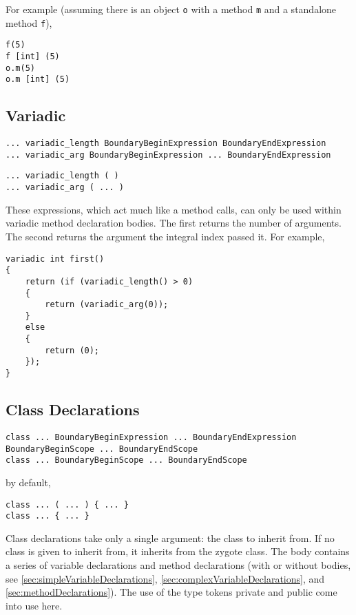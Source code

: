\documentclass[10pt,a4paper]{article}
\begin{document}
For example (assuming there is an object \verb|o| with a method \verb|m| and a standalone method \verb|f|),
\begin{verbatim}
f(5)
f [int] (5)
o.m(5)
o.m [int] (5)
\end{verbatim}

\subsection{Variadic}
\label{sec:variadic}
\begin{verbatim}
... variadic_length BoundaryBeginExpression BoundaryEndExpression
... variadic_arg BoundaryBeginExpression ... BoundaryEndExpression
\end{verbatim}

\begin{verbatim}
... variadic_length ( )
... variadic_arg ( ... )
\end{verbatim}

These expressions, which act much like a method calls, can only be used within variadic method declaration bodies. The first returns the number of arguments. The second returns the argument the integral index passed it. For example,
\begin{verbatim}
variadic int first()
{
	return (if (variadic_length() > 0)
	{
    	return (variadic_arg(0));
    }
    else
    {
    	return (0);
    });
}
\end{verbatim}

\subsection{Class Declarations}
\begin{verbatim}
class ... BoundaryBeginExpression ... BoundaryEndExpression BoundaryBeginScope ... BoundaryEndScope
class ... BoundaryBeginScope ... BoundaryEndScope
\end{verbatim}

by default,
\begin{verbatim}
class ... ( ... ) { ... }
class ... { ... }
\end{verbatim}

Class declarations take only a single argument: the class to inherit from. If no class is given to inherit from, it inherits from the zygote class. The body contains a series of variable declarations and method declarations (with or without bodies, see \ref{sec:simpleVariableDeclarations}, \ref{sec:complexVariableDeclarations}, and \ref{sec:methodDeclarations}). The use of the type tokens private and public come into use here.
\end{document}
